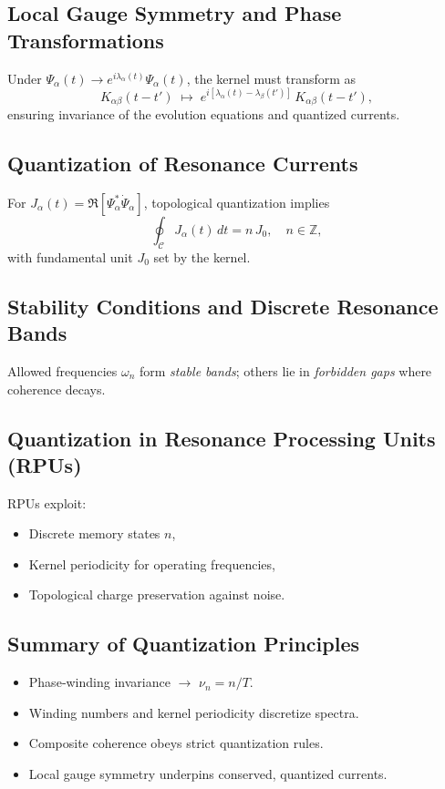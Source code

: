 \subsection{Local Gauge Symmetry and Phase Transformations}
Under
\(\Psi_{\alpha}(t)\to e^{i\lambda_{\alpha}(t)}\Psi_{\alpha}(t)\),
the kernel must transform as
\[
K_{\alpha\beta}(t-t')
\;\mapsto\;
e^{i[\lambda_{\alpha}(t)-\lambda_{\beta}(t')]}
\,K_{\alpha\beta}(t-t'),
\]
ensuring invariance of the evolution equations and quantized currents.

\subsection{Quantization of Resonance Currents}
For
\(J_{\alpha}(t)=\Re[\Psi_{\alpha}^{*}\dot\Psi_{\alpha}]\),
topological quantization implies
\[
\oint_{\mathcal C}J_{\alpha}(t)\,dt
= n\,J_{0},\quad n\in\mathbb Z,
\]
with fundamental unit \(J_{0}\) set by the kernel.

\subsection{Stability Conditions and Discrete Resonance Bands}
Allowed frequencies \(\omega_{n}\) form \emph{stable bands}; others lie in \emph{forbidden gaps} where coherence decays.

\subsection{Quantization in Resonance Processing Units (RPUs)}
RPUs exploit:
\begin{itemize}
  \item Discrete memory states \(n\),
  \item Kernel periodicity for operating frequencies,
  \item Topological charge preservation against noise.
\end{itemize}

\subsection{Summary of Quantization Principles}
\begin{itemize}
  \item Phase‐winding invariance \(\to\) \(\nu_{n}=n/T\).
  \item Winding numbers and kernel periodicity discretize spectra.
  \item Composite coherence obeys strict quantization rules.
  \item Local gauge symmetry underpins conserved, quantized currents.
\end{itemize}

